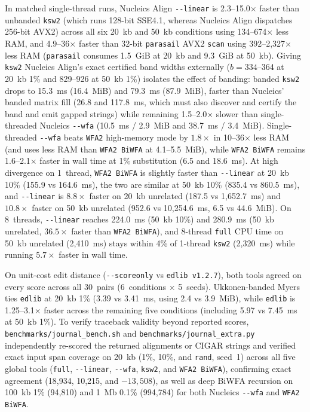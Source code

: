 \documentclass[11pt,a4paper]{article}
\begin{document}
In matched single-thread runs, Nucleics Align \texttt{-{}-linear} is 2.3--15.0$\times$ faster than unbanded \texttt{ksw2} (which runs 128-bit SSE4.1, whereas Nucleics Align dispatches 256-bit AVX2) across all six 20~kb and 50~kb conditions using 134--674$\times$ less RAM, and 4.9--36$\times$ faster than 32-bit \texttt{parasail} AVX2 \texttt{scan} using 392--2,327$\times$ less RAM (\texttt{parasail} consumes 1.5~GiB at 20~kb and 9.3~GiB at 50~kb). Giving \texttt{ksw2} Nucleics Align's exact certified band widths externally ($b = 334$--364 at 20~kb 1\% and 829--926 at 50~kb 1\%) isolates the effect of banding: banded \texttt{ksw2} drops to 15.3~ms (16.4~MiB) and 79.3~ms (87.9~MiB), faster than Nucleics' banded matrix fill (26.8 and 117.8~ms, which must also discover and certify the band and emit gapped strings) while remaining 1.5--2.0$\times$ slower than single-threaded Nucleics \texttt{-{}-wfa} (10.5~ms / 2.9~MiB and 38.7~ms / 3.4~MiB). Single-threaded \texttt{-{}-wfa} beats \texttt{WFA2} high-memory mode by $1.8\times$ in 10--36$\times$ less RAM (and uses less RAM than \texttt{WFA2 BiWFA} at 4.1--5.5~MiB), while \texttt{WFA2 BiWFA} remains 1.6--2.1$\times$ faster in wall time at 1\% substitution (6.5 and 18.6~ms). At high divergence on 1~thread, \texttt{WFA2 BiWFA} is slightly faster than \texttt{-{}-linear} at 20~kb 10\% (155.9 vs 164.6~ms), the two are similar at 50~kb 10\% (835.4 vs 860.5~ms), and \texttt{-{}-linear} is $8.8\times$ faster on 20~kb unrelated (187.5 vs 1,652.7~ms) and $10.8\times$ faster on 50~kb unrelated (952.6 vs 10,254.6~ms, 6.5 vs 44.6~MiB). On 8~threads, \texttt{-{}-linear} reaches 224.0~ms (50~kb 10\%) and 280.9~ms (50~kb unrelated, $36.5\times$ faster than \texttt{WFA2 BiWFA}), and 8-thread \texttt{full} CPU time on 50~kb unrelated (2,410~ms) stays within 4\% of 1-thread \texttt{ksw2} (2,320~ms) while running $5.7\times$ faster in wall time.

On unit-cost edit distance (\texttt{-{}-scoreonly} vs \texttt{edlib v1.2.7}), both tools agreed on every score across all 30~pairs (6~conditions $\times$ 5~seeds). Ukkonen-banded Myers ties \texttt{edlib} at 20~kb 1\% (3.39 vs 3.41~ms, using 2.4 vs 3.9~MiB), while \texttt{edlib} is 1.25--3.1$\times$ faster across the remaining five conditions (including 5.97 vs 7.45~ms at 50~kb 1\%). To verify traceback validity beyond reported scores, \texttt{benchmarks/journal\_bench.sh} and \texttt{benchmarks/journal\_extra.py} independently re-scored the returned alignments or CIGAR strings and verified exact input span coverage on 20~kb (1\%, 10\%, and \texttt{rand}, seed~1) across all five global tools (\texttt{full}, \texttt{-{}-linear}, \texttt{-{}-wfa}, \texttt{ksw2}, and \texttt{WFA2 BiWFA}), confirming exact agreement (18,934, 10,215, and $-13{,}508$), as well as deep BiWFA recursion on 100~kb 1\% (94,810) and 1~Mb 0.1\% (994,784) for both Nucleics \texttt{-{}-wfa} and \texttt{WFA2 BiWFA}.
\end{document}
